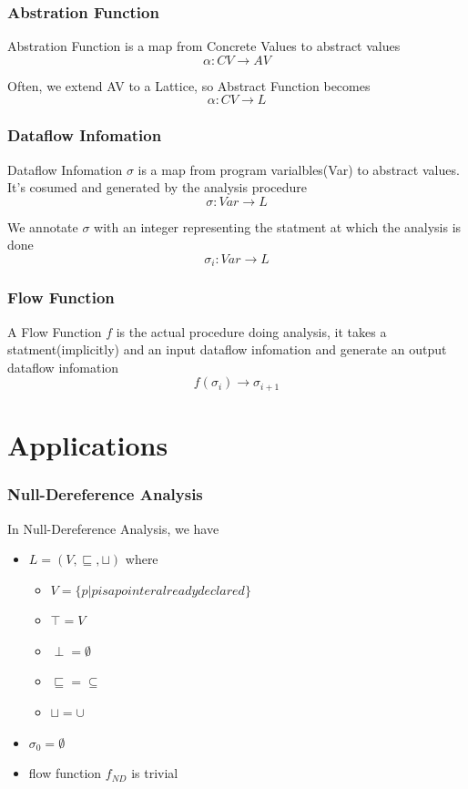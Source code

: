 \documentclass[]{beamer}
\begin{document}
\begin{frame}
  \frametitle{Abstration Function}
  \alert{Abstration Function} is a map from Concrete Values to abstract values
  $$\alpha : CV \rightarrow AV$$

  \vspace{1em}\pause
  Often, we extend AV to a Lattice, so Abstract Function becomes
  $$\alpha : CV \rightarrow L$$
\end{frame}

\begin{frame}
  \frametitle{Dataflow Infomation}
  \alert{Dataflow Infomation} $\sigma$ is a map from program varialbles(Var) to abstract values.
  It's cosumed and generated by the analysis procedure
  $$\sigma : Var \rightarrow L$$

  \vspace{1em}\pause
  We annotate $\sigma$ with an integer representing the statment at which the analysis is done
  $$\sigma_i : Var \rightarrow L$$
\end{frame}

\begin{frame}
  \frametitle{Flow Function}
  A \alert{Flow Function} $f$ is the actual procedure doing analysis, it takes a statment(implicitly)
  and an input dataflow infomation and generate an output dataflow infomation
  $$f(\sigma_i) \rightarrow \sigma_{i+1}$$
\end{frame}

\section{Applications}
\frame{\tableofcontents[currentsection]}

\begin{frame}
  \frametitle{Null-Dereference Analysis}
  In Null-Dereference Analysis, we have
  \begin{itemize}
    \item $L=(V, \sqsubseteq, \sqcup)$ where
      \begin{itemize}
      \item $V=\{p | p is a pointer already declared\}$
      \item $\top = V$
      \item $\perp = \emptyset$
      \item $\sqsubseteq = \subseteq$
      \item $\sqcup = \cup$
      \end{itemize}
    \item $\sigma_0 = \emptyset$
    \item flow function $f_{ND}$ is trivial
  \end{itemize}
\end{frame}
\end{document}
